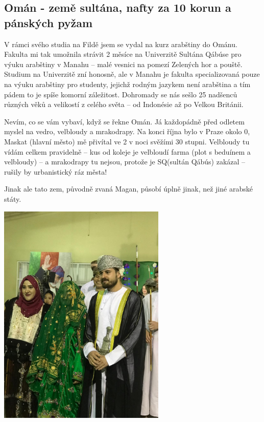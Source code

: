\subsection *{Omán - země sultána, nafty za 10 korun a pánských pyžam}
\label{sub:omán_-_země sultána_ nafty_za_10_korun_a_pánských_pyžam}

V rámci svého studia na Fildě jsem se vydal na kurz arabštiny do Ománu. Fakulta mi tak umožnila strávit 2 měsíce na Univerzitě Sultána Qábúse pro výuku arabštiny v Manahu – malé vesnici na pomezí Zelených hor a pouště. Studium na Univerzitě zní honosně, ale v Manahu je fakulta specializovaná pouze na výuku arabštiny pro studenty, jejichž rodným jazykem není arabština a tím pádem to je spíše komorní záležitost. Dohromady se nás sešlo 25 nadšenců různých věků a velikostí z celého světa – od Indonésie až po Velkou Británii. 

Nevím, co se vám vybaví, když se řekne Omán. Já každopádně před odletem myslel na vedro, velbloudy a mrakodrapy. Na konci října bylo v Praze okolo 0, Maskat (hlavní město) mě přivítal ve 2 v noci svěžími 30 stupni. Velbloudy tu vídám celkem pravidelně – kus od koleje je velbloudí farma (plot s beduínem a velbloudy) – a mrakodrapy tu nejsou, protože je SQ(sultán Qábús) zakázal – rušily by urbanistický ráz města! 

Jinak ale tato zem, původně zvaná Magan, působí úplně jinak, než jiné arabské státy.

\begin{center}
\includegraphics[width=8cm]{img/udo_clanky/Humr_oman.jpg}
\end{center}


